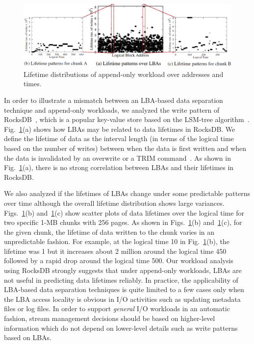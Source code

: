 \begin{figure}[t]
	\includegraphics[width=\linewidth]{figure/pcstream/fig1}
	\caption{Lifetime distributions of append-only workload over addresses and times.}
	\label{fig:lba_lifetime}
\end{figure}


In order to illustrate a mismatch between an LBA-based data separation technique and 
append-only workloads, we analyzed the write pattern of 
RocksDB~\cite{RocksDB}, which is a
popular key-value store based on the LSM-tree algorithm~\cite{LSM}.
Fig.~\ref{fig:lba_lifetime}(a) shows how LBAs may be related 
to data lifetimes in RocksDB.  
We define the lifetime of data as the interval length (in terms of
the logical time based on the number of writes) between
when the data is first written and when the data is invalidated
by an overwrite or a TRIM command~\cite{TRIM}.
As shown in Fig.~\ref{fig:lba_lifetime}(a), 
there is no strong correlation between LBAs and their lifetimes in RocksDB.  

We also analyzed 
if the lifetimes of LBAs change under some predictable patterns over time 
although the overall lifetime distribution shows large variances.
Figs.~\ref{fig:lba_lifetime}(b) and~\ref{fig:lba_lifetime}(c) show
scatter plots of data lifetimes over the logical time 
for two specific 1-MB chunks with 256 pages. 
As shown in Figs.~\ref{fig:lba_lifetime}(b) and~\ref{fig:lba_lifetime}(c), 
for the given chunk, the lifetime of data written to the chunk 
varies in an unpredictable fashion.  
For example, at the logical time 10 in Fig.~\ref{fig:lba_lifetime}(b), 
the lifetime was 1 but it increases about 
2 million around the logical time 450 
followed by a rapid drop around the logical time 500. 
Our workload analysis using RocksDB strongly suggests that under append-only workloads, 
LBAs are not useful in predicting data lifetimes reliably.
In practice, the applicability of LBA-based data separation techniques is quite 
limited to a few cases only when the LBA access
locality is obvious in I/O activities such as updating metadata files or log files.  
In order to support {\it general} I/O workloads in an automatic fashion, stream 
management decisions should be based on higher-level information
which do not depend on lower-level details such as write patterns based on LBAs.

